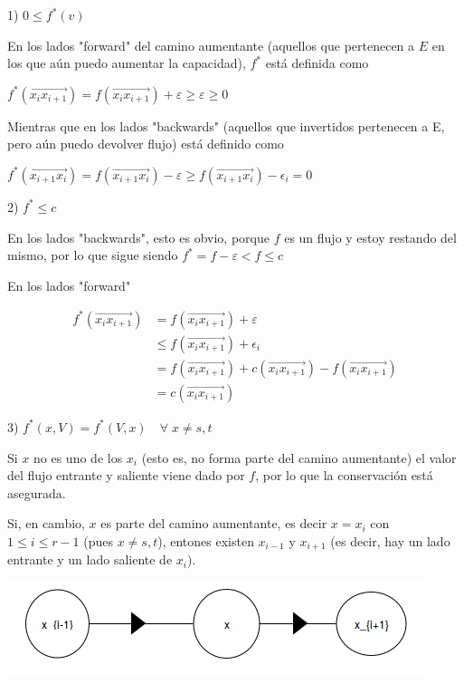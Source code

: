 \documentclass[10pt,a4paper]{article}
\begin{document}
1) $0 \leq f^* (v)$

En los lados "forward" del camino aumentante (aquellos que pertenecen a $E$ en los que aún puedo aumentar la capacidad), $f^*$ está definida como

\begin{center}
$f^*(\overrightarrow{x_ix_{i+1}}) = f(\overrightarrow{x_ix_{i+1}})+\varepsilon \geq \varepsilon \geq 0 $
\end{center}

Mientras que en los lados "backwards" (aquellos que invertidos pertenecen a E, pero aún puedo devolver flujo) está definido como

\begin{center}
$f^*(\overrightarrow{x_{i+1}x_{i}}) = f(\overrightarrow{x_{i+1}x_{i}}) - \varepsilon \geq f(\overrightarrow{x_{i+1}x_{i}}) -\epsilon_i = 0$
\end{center}

2) $f^* \leq c$

En los lados "backwards", esto es obvio, porque $f$ es un flujo y estoy restando del mismo, por lo que sigue siendo $f^* = f - \varepsilon < f \leq c $

En los lados "forward"

\begin{center}
\begin{align*} f^*(\overrightarrow{x_ix_{i+1}}) &= f(\overrightarrow{x_ix_{i+1}}) + \varepsilon\\ &\leq f(\overrightarrow{x_ix_{i+1}}) + \epsilon_i\\ &= f(\overrightarrow{x_ix_{i+1}})+c(\overrightarrow{x_ix_{i+1}})-f(\overrightarrow{x_ix_{i+1}})\\ &= c(\overrightarrow{x_ix_{i+1}}) \end{align*}
\end{center}

3) $f^*(x, V) = f^*(V, x) \quad\forall\; x\neq s, t$

Si $x$ no es uno de los $x_i$ (esto es, no forma parte del camino aumentante) el valor del flujo entrante y saliente viene dado por $f$, por lo que la conservación está asegurada.

Si, en cambio, $x$ es parte del camino aumentante, es decir $x = x_i$ con $1 \leq i \leq r-1$ (pues $x \neq s, t$), entones existen $x_{i-1}$ y $x_{i+1}$ (es decir, hay un lado entrante y un lado saliente de $x_i$).

\begin{center}

    \begin{adjustbox}{max size={\textwidth}{\textheight}}
        \includegraphics{definitions/f_estrella_1.jpg}
        \end{adjustbox}
    
\end{center}
\end{document}
